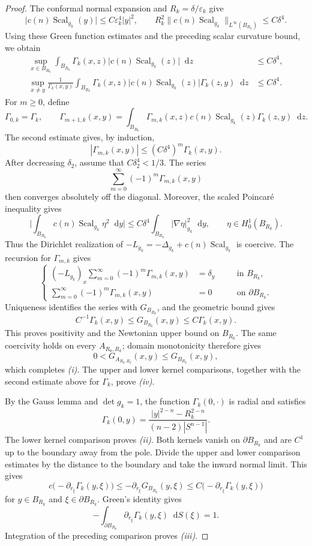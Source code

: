\documentclass[11pt]{article}
\numberwithin{equation}{section}
\theoremstyle{remark}
\newcommand{\Sph}{S}
\newcommand{\dd}{\mathop{}\!\mathrm{d}}
\begin{document}
\begin{proof}
The conformal normal  expansion and
$R_k=\delta/\varepsilon_k$ give
{
\[
 \bigl|c(n)\operatorname{Scal}_{g_k}(y)\bigr|
 \le C\varepsilon_k^4|y|^2,
 \qquad
 R_k^2\bigl\|c(n)\operatorname{Scal}_{g_k}
 \bigr\|_{L^\infty(B_{R_k})}\le C\delta^4.
\]
}
Using these Green function estimates and the preceding
scalar curvature bound, we obtain
{
\[
\begin{aligned}
 \sup_{x\in B_{R_k}}\int_{B_{R_k}}
 \Gamma_k(x,z)\bigl|c(n)\operatorname{Scal}_{g_k}(z)\bigr|\dd z
 &\le C\delta^4,\\
 \sup_{x\ne y}\frac{1}{\Gamma_k(x,y)}
 \int_{B_{R_k}}\Gamma_k(x,z)
 \bigl|c(n)\operatorname{Scal}_{g_k}(z)\bigr|
 \Gamma_k(z,y)\dd z
 &\le C\delta^4.
\end{aligned}
\]
}
For  $m\ge0$, define
{
\[
 \Gamma_{0,k}=\Gamma_k,
 \qquad \Gamma_{m+1,k}(x,y)=\int_{B_{R_k}}\Gamma_{m,k}(x,z)
 c(n)\operatorname{Scal}_{g_k}(z)
 \Gamma_k(z,y)\dd z.
\]
}
 The second estimate gives, by induction,
{
\[
 |\Gamma_{m,k}(x,y)|\le(C\delta^4)^m\Gamma_k(x,y).
\]
}
 After decreasing $\delta_2$, assume that $C\delta_2^4<1/3$.  The series
{
\[
 \sum_{m=0}^{\infty}(-1)^m\Gamma_{m,k}(x,y)
\]
}
 then converges absolutely off the diagonal.  Moreover, the scaled
Poincar\'e inequality gives
{
\[
 \bigg|\int_{B_{R_k}}c(n)
 \operatorname{Scal}_{g_k}\eta^2\dd y\bigg|
 \le C\delta^4\int_{B_{R_k}}|\nabla\eta|_{g_k}^2\dd y,
 \qquad \eta\in H_0^1(B_{R_k}).
\]
}
Thus the Dirichlet realization of
$-L_{g_k}=-\Delta_{g_k}+c(n)\operatorname{Scal}_{g_k}$ is
coercive.  The recursion for $\Gamma_{m,k}$ gives
{
\[
{\left\{\begin{aligned}
 (-L_{g_k})_x\sum_{m=0}^{\infty}(-1)^m\Gamma_{m,k}(x,y)
 &=\delta_y&&\quad\text{in }B_{R_k},\\
 \sum_{m=0}^{\infty}(-1)^m\Gamma_{m,k}(x,y)
 &=0&&\quad\text{on }\partial B_{R_k}.
\end{aligned}\right.}
\]
}
Uniqueness identifies the series with $G_{B_{R_k}}$, and the geometric
bound gives
{
\[
 C^{-1}\Gamma_k(x,y)
 \le G_{B_{R_k}}(x,y)
 \le C\Gamma_k(x,y).
\]
}
This proves positivity and the Newtonian upper bound on $B_{R_k}$.
The same coercivity holds on every $A_{R_0,R_k}$; domain monotonicity
therefore gives
{
\[
 0<G_{A_{R_0,R_k}}(x,y)\le G_{B_{R_k}}(x,y),
\]
}
which completes \emph{(i)}.  The upper and lower kernel comparisons,
together with the second estimate above for $\Gamma_k$, prove \emph{(iv)}.

 By the Gauss lemma and $\det g_k=1$, the function
$\Gamma_k(0,\cdot)$ is radial and satisfies
{
\[
 \Gamma_k(0,y)=\frac{|y|^{2-n}-R_k^{2-n}}
 {(n-2)|\Sph^{n-1}|}.
\]
}
The lower kernel comparison proves \emph{(ii)}.  Both kernels vanish on
$\partial B_{R_k}$ and are $C^1$ up to the boundary away from the pole.
Divide the upper and lower comparison estimates by the distance to the boundary and take
the inward normal limit.  This gives
{
\[
 c\bigl(-\partial_{r_\xi}\Gamma_k(y,\xi)\bigr)
 \le-\partial_{r_\xi}G_{B_{R_k}}(y,\xi)
 \le C\bigl(-\partial_{r_\xi}\Gamma_k(y,\xi)\bigr)
\]
}
for $y\in B_{R_k}$ and $\xi\in\partial B_{R_k}$.  Green's identity gives
{
\[
 -\int_{\partial B_{R_k}}\partial_{r_\xi}
 \Gamma_k(y,\xi)\dd S(\xi)=1.
\]
}
Integration of the preceding comparison proves \emph{(iii)}.
\end{proof}
\end{document}
